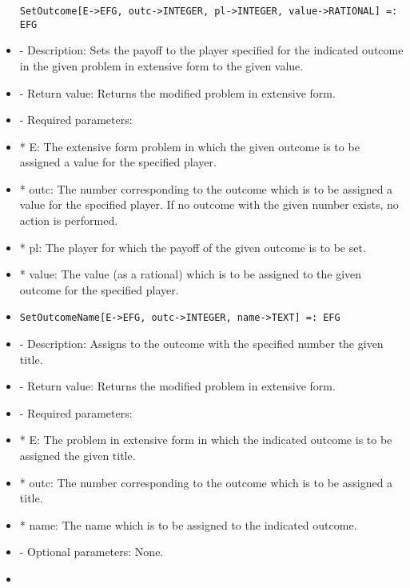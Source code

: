 \begin{itemize}
\begin{verbatim} 
SetOutcome[E->EFG, outc->INTEGER, pl->INTEGER, value->RATIONAL] =: EFG
\end{verbatim}

\bd
\item
- Description:  Sets the payoff to the player specified for the indicated
outcome in the given problem in extensive form to the given value.
\item
- Return value:  Returns the modified problem in extensive form.
\item
- Required parameters:
	
\bd
\item
*  E:  The extensive form problem in which the given outcome is to be
assigned a value for the specified player.
\item
*  outc:  The number corresponding to the outcome which is to be 
assigned a value for the specified player.  If no outcome with
the given number exists, no action is performed.
\item
*  pl:  The player for which the payoff of the given outcome is to be
set.
\item
*  value:  The value (as a rational) which is to be assigned to the 
given outcome for the specified player.
\ed
\ed

\item

\begin{verbatim}
SetOutcomeName[E->EFG, outc->INTEGER, name->TEXT] =: EFG
\end{verbatim}

\bd
\item
- Description:  Assigns to the outcome with the specified number the 
given title.
\item
- Return value:  Returns the modified problem in extensive form.
\item
- Required parameters:
	
\bd
\item
*  E:  The problem in extensive form in which the indicated outcome 
is to be assigned the given title.
\item
*  outc:  The number corresponding to the outcome which is to be 
assigned a title.
\item
*  name:  The name which is to be assigned to the indicated outcome.
\ed

\item
- Optional parameters:  None.
\ed

\item


\end{itemize}
